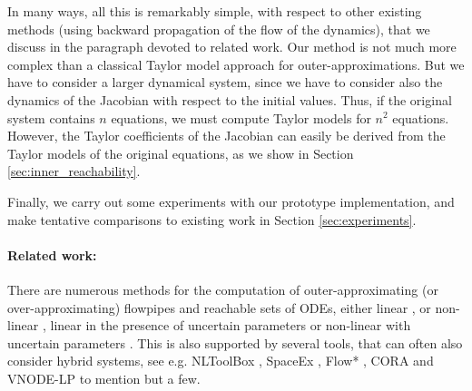\documentclass{sig-alternate-05-2015}
\begin{document}
In many ways, all this is remarkably simple, with respect to other existing methods (using backward propagation
of the flow of the dynamics), that we discuss in the paragraph devoted to related work. Our method
is not much more complex than a classical Taylor model approach for outer-approximations. 
But we have to consider a larger dynamical system, since we have to consider also the dynamics of the Jacobian with respect to the initial values.
Thus, if the original system contains $n$ equations, we must compute Taylor models for $n^2$ equations. However, the Taylor coefficients of the Jacobian 
can easily be derived from the Taylor models of the original equations, as we show in Section \ref{sec:inner_reachability}.  

Finally, we carry out some 
experiments with our prototype implementation, and make tentative comparisons to existing work in Section \ref{sec:experiments}. 




\paragraph{Related work:}
\label{relatedwork}

There are numerous methods for the computation of outer-approximating (or over-approximating) flowpipes
and reachable sets of ODEs, either linear \cite{GirardLinear06,LeGuernic09}, or non-linear \cite{Nedialkov99,Dang4,Dang3}, linear
in the presence of uncertain parameters \cite{GirardHSCC2005}
or non-linear with uncertain parameters \cite{Althoff}. This is also 
supported by several tools,
that can often also consider hybrid systems, see e.g. NLToolBox \cite{NLTOOLBOX}, 
SpaceEx \cite{SPACEEX}, Flow* \cite{FLOW}, CORA \cite{Althoff2} and VNODE-LP \cite{VNODELP} to mention but a few. 
\end{document}
